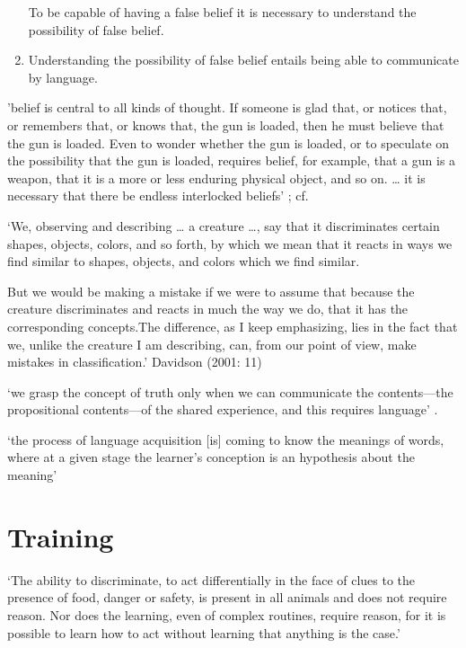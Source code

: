\documentclass[12pt]{extarticle}
\begin{document}
\begin{multicols}{3}
\begin{enumerate}
To be capable of having a false belief it is necessary to understand the possibility of false belief.
 
\item
 
Understanding the possibility of false belief entails being able to communicate by language.
 
\end{enumerate}
 
'belief is central to all kinds of thought.  If someone is glad that, or notices that, or remembers that, or knows that, the gun is loaded, then he must believe that the gun is loaded.  Even to wonder whether the gun is loaded, or to speculate on the possibility that the gun is loaded, requires belief, for example, that a gun is a weapon, that it is a more or less enduring physical object, and so on.  …  it is necessary that there be endless interlocked beliefs'
\citep[p.\ 157]{Davidson:1975eq}; cf. \citep[pp.\ 320--1]{Davidson:1982je}
 
‘We, observing and describing … a creature …, say that it discriminates certain shapes, objects, colors, and so forth, by which we mean that it reacts in ways we find similar to shapes, objects, and colors which we find similar.

But we would be making a mistake if we were to assume that because the creature discriminates and reacts in much the way we do, that it has the corresponding concepts.The difference, as I keep emphasizing, lies in the fact that we, unlike the creature I am describing, can, from our point of view, make mistakes in classification.’
Davidson (2001: 11)

\citep[p.\ 11]{Davidson:2001np}
 
‘we grasp the concept of truth only when we can communicate the contents---the propositional contents---of the shared experience, and this requires language’
\citep[p.\ 27]{Davidson:1997wj}.
 
‘the process of language acquisition [is] coming to know the meanings of words, where at a given stage the learner’s conception is an hypothesis about the meaning’
\citep[p.\ 153]{Higginbotham:1998rm}
 
 
 
\section{Training}
 
‘The ability to discriminate, to act differentially in the face of clues to the presence of food, danger or safety, is present in all animals and does not require reason.  Nor does the learning, even of complex routines, require reason, for it is possible to learn how to act without learning that anything is the case.’
\citep[p.\ 326]{Davidson:1982je}
 

\end{multicols}
\end{document}
